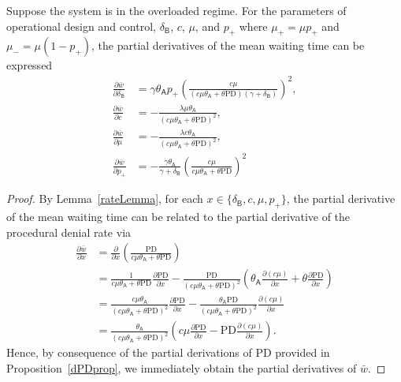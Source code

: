 \documentclass[manuscript,screen,authorversion]{acmart}
\begin{document}
\begin{proposition}\label{dWaitprop}
Suppose the system is in the overloaded regime. For the parameters of operational design and control, $\delta_\mathsf{B}$, $c$, $\mu$, and $p_+$ where $\mu_+ = \mu p_+$ and $\mu_- = \mu(1-p_+)$, the partial derivatives of the mean waiting time can be expressed
\begin{align}
\frac{\partial \bar w}{\partial \delta_\mathsf{B}}
&=
\gamma \theta_\mathsf{A} p_+
\left(
\frac{c\mu }{\left(c\mu\theta_\mathsf{A} + \theta \mathrm{PD}\right)(\gamma + \delta_\mathsf{B})}
\right)^2
,
\\
\frac{\partial \bar w}{\partial c}
&=
-
\frac{\lambda \mu \theta_\mathsf{A} }{\left(c\mu\theta_\mathsf{A} + \theta \mathrm{PD}\right)^2}
,
\\
\frac{\partial \bar w}{\partial \mu}
&=
-
\frac{\lambda c \theta_\mathsf{A} }{\left(c\mu\theta_\mathsf{A} + \theta \mathrm{PD}\right)^2}
,
\\
\frac{\partial \bar w}{\partial p_+}
&=
-
\frac{\gamma \theta_\mathsf{A}}{\gamma + \delta_\mathsf{B}}
\left(
\frac{c\mu}{c\mu\theta_\mathsf{A} + \theta \mathrm{PD}}
\right)^2
\end{align}
\end{proposition}
\begin{proof}
By Lemma~\ref{rateLemma}, for each $x \in \{\delta_\mathsf{B}, c, \mu, p_+\}$, the partial derivative of the mean waiting time can be related to the partial derivative of the procedural denial rate via
\begin{align}
\frac{\partial \bar w}{\partial x}
&=
\frac{\partial}{\partial x}
\left(
\frac{\mathrm{PD}}{c\mu\theta_\mathsf{A} + \theta \mathrm{PD}}
\right)
\\
&=
\frac{1}{c\mu\theta_\mathsf{A} + \theta \mathrm{PD}}
\frac{\partial \mathrm{PD}}{\partial x}
-
\frac{\mathrm{PD}}{\left(c\mu\theta_\mathsf{A} + \theta \mathrm{PD}\right)^2}
\left(
\theta_\mathsf{A} \frac{\partial (c\mu)}{\partial x}  + \theta \frac{\partial \mathrm{PD}}{\partial x}
\right)
\\
&=
\frac{c\mu\theta_\mathsf{A}}{\left(c\mu\theta_\mathsf{A} + \theta \mathrm{PD}\right)^2}
\frac{\partial \mathrm{PD}}{\partial x}
-
\frac{\theta_\mathsf{A} \mathrm{PD}}{\left(c\mu\theta_\mathsf{A} + \theta \mathrm{PD}\right)^2}
 \frac{\partial (c\mu)}{\partial x}  
 \\
&=
\frac{\theta_\mathsf{A} }{\left(c\mu\theta_\mathsf{A} + \theta \mathrm{PD}\right)^2}
\left(
c\mu
\frac{\partial \mathrm{PD}}{\partial x}
-
\mathrm{PD}
 \frac{\partial (c\mu)}{\partial x}  
 \right)
 .
\end{align}
Hence, by consequence of the partial derivations of $\mathrm{PD}$ provided in Proposition~\ref{dPDprop}, we immediately obtain the partial derivatives of $\bar w$.
\end{proof}
\end{document}
